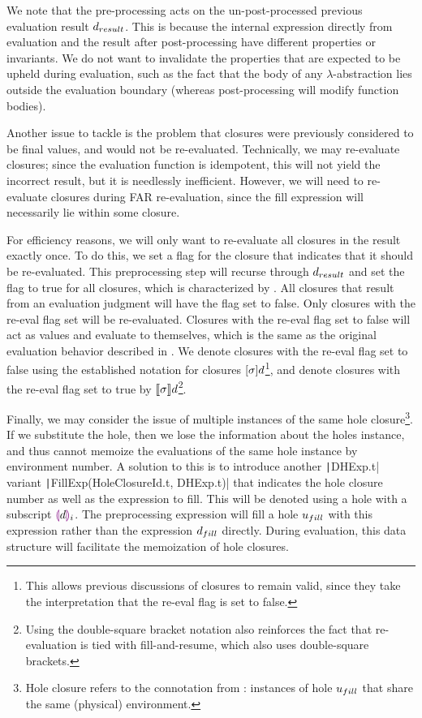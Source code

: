 We note that the pre-processing acts on the un-post-processed previous evaluation result $d_{result}$. This is because the internal expression directly from evaluation and the result after post-processing have different properties or invariants. We do not want to invalidate the properties that are expected to be upheld during evaluation, such as the fact that the body of any $\lambda$-abstraction lies outside the evaluation boundary (whereas post-processing will modify function bodies).

Another issue to tackle is the problem that closures were previously considered to be final values, and would not be re-evaluated. Technically, we may re-evaluate closures; since the evaluation function is idempotent, this will not yield the incorrect result, but it is needlessly inefficient. However, we will need to re-evaluate closures during FAR re-evaluation, since the fill expression will necessarily lie within some closure.

For efficiency reasons, we will only want to re-evaluate all closures in the result exactly once. To do this, we set a flag for the closure that indicates that it should be re-evaluated. This preprocessing step will recurse through $d_{result}$ and set the flag to true for all closures, which is characterized by . All closures that result from an evaluation judgment will have the flag set to false. Only closures with the re-eval flag set will be re-evaluated. Closures with the re-eval flag set to false will act as values and evaluate to themselves, which is the same as the original evaluation behavior described in . We denote closures with the re-eval flag set to false using the established notation for closures $[\sigma]d$\footnote{This allows previous discussions of closures to remain valid, since they take the interpretation that the re-eval flag is set to false.}, and denote closures with the re-eval flag set to true by $\llbracket\sigma\rrbracket d$\footnote{Using the double-square bracket notation also reinforces the fact that re-evaluation is tied with fill-and-resume, which also uses double-square brackets.}.

Finally, we may consider the issue of multiple instances of the same hole closure\footnote{Hole closure refers to the connotation from : instances of hole $u_{fill}$ that share the same (physical) environment.}. If we substitute the hole, then we lose the information about the holes instance, and thus cannot memoize the evaluations of the same hole instance by environment number. A solution to this is to introduce another \texttt|DHExp.t| variant \texttt|FillExp(HoleClosureId.t, DHExp.t)| that indicates the hole closure number as well as the expression to fill. This will be denoted using a hole with a subscript $\textcolor{violet}{\llparenthesis} d\textcolor{violet}{\rrparenthesis}_i$. The preprocessing expression will fill a hole $u_{fill}$ with this expression rather than the expression $d_{fill}$ directly. During evaluation, this data structure will facilitate the memoization of hole closures.

